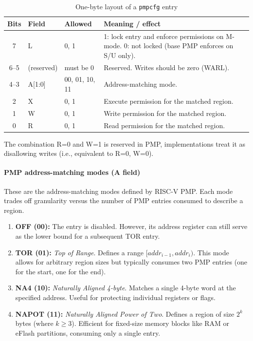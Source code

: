 \documentclass[10pt,a4paper,twocolumn,twoside]{article}
\begin{document}
\begin{table}[!t]
\centering
\begin{threeparttable}
\caption{One-byte layout of a \texttt{pmpcfg} entry}
\label{tab:pmpcfg-byte}
\small
\setlength{\tabcolsep}{6pt}
\renewcommand{\arraystretch}{1.2}
\begin{tabularx}{\linewidth}{@{}c l l X@{}}
\toprule
\textbf{Bits} & \textbf{Field} & \textbf{Allowed} & \textbf{Meaning / effect} \\
\midrule
7    & L          & 0, 1 & 1: lock entry and enforce permissions on M-mode. 0: not locked (base PMP enforces on S/U only). \\
6--5 & (reserved) & must be 0 & Reserved. Writes should be zero (WARL). \\
4--3 & A[1:0]     & 00, 01, 10, 11 & Address-matching mode. \\
2    & X          & 0, 1 & Execute permission for the matched region. \\
1    & W          & 0, 1 & Write permission for the matched region.\tnote{*} \\
0    & R          & 0, 1 & Read permission for the matched region. \\
\bottomrule
\end{tabularx}
\begin{tablenotes}\footnotesize
\item[*] The combination R=0 and W=1 is reserved in PMP, implementations treat it as disallowing writes (i.e., equivalent to R=0, W=0).
\end{tablenotes}
\end{threeparttable}
\end{table}

\FloatBarrier 

\paragraph{PMP address-matching modes (A field)}
These are the address-matching modes defined by RISC-V PMP. Each mode trades off granularity versus the number of PMP entries consumed to describe a region.
\begin{enumerate}
  \item \textbf{OFF (00):} The entry is disabled. However, its address register can still serve as the lower bound for a subsequent TOR entry.
  \item \textbf{TOR (01):} \emph{Top of Range}. Defines a range $[addr_{i-1}, addr_i)$. This mode allows for arbitrary region sizes but typically consumes two PMP entries (one for the start, one for the end).
  \item \textbf{NA4 (10):} \emph{Naturally Aligned 4-byte}. Matches a single 4-byte word at the specified address. Useful for protecting individual registers or flags.
  \item \textbf{NAPOT (11):} \emph{Naturally Aligned Power of Two}. Defines a region of size $2^{k}$ bytes (where $k \ge 3$). Efficient for fixed-size memory blocks like RAM or eFlash partitions, consuming only a single entry.
\end{enumerate}
\end{document}
